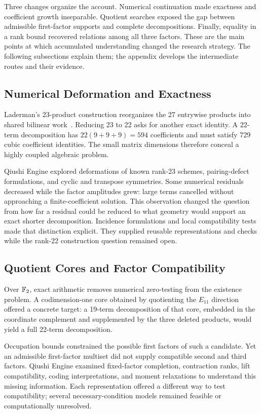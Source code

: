 Three changes organize the account. Numerical continuation made exactness
and coefficient growth inseparable. Quotient searches exposed the gap
between admissible first-factor supports and complete decompositions.
Finally, equality in a rank bound recovered relations among all three
factors. These are the main points at which accumulated understanding
changed the research strategy. The following subsections explain them;
the appendix develops the intermediate routes and their evidence.

\subsection{Numerical Deformation and Exactness}

Laderman's 23-product construction reorganizes the 27 entrywise products
into shared bilinear work~\cite{laderman1976noncommutative}. Reducing 23 to
22 asks for another exact identity. A 22-term decomposition has
$22(9+9+9)=594$ coefficients and must satisfy 729 cubic coefficient
identities. The small matrix dimensions therefore conceal a highly
coupled algebraic problem.

Qiushi Engine explored deformations of known rank-23 schemes,
pairing-defect formulations, and cyclic and transpose symmetries.
Some numerical residuals decreased while the factor amplitudes grew:
large terms cancelled without approaching a finite-coefficient solution.
This observation changed the question from how far a residual could be
reduced to what geometry would support an exact shorter decomposition.
Incidence formulations and local compatibility tests made that distinction
explicit. They supplied reusable representations and checks while the
rank-22 construction question remained open.

\subsection{Quotient Cores and Factor Compatibility}

Over $\mathbb{F}_2$, exact arithmetic removes numerical zero-testing from the
existence problem. A codimension-one core obtained by quotienting the
$E_{11}$ direction offered a concrete target: a 19-term decomposition of
that core, embedded in the coordinate complement and supplemented by the
three deleted products, would yield a full 22-term decomposition.

Occupation bounds constrained the possible first factors of such a
candidate. Yet an admissible first-factor multiset did not supply
compatible second and third factors. Qiushi Engine examined fixed-factor
completion, contraction ranks, lift compatibility, coding interpretations,
and moment relaxations to understand this missing information. Each
representation offered a different way to test compatibility; several
necessary-condition models remained feasible or computationally unresolved.

